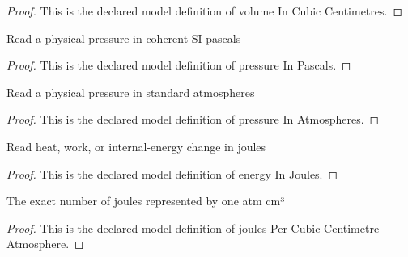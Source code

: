 \begin{proof}
  This is the declared model definition of volume In Cubic Centimetres.
\end{proof}
\begin{definition}
  \label{def:physics:phyx-mini-0410:phyxminiproblems-problemphyxmini0410-pressureinpascals}
  Read a physical pressure in coherent SI pascals
\end{definition}
\begin{proof}
  This is the declared model definition of pressure In Pascals.
\end{proof}
\begin{definition}
  \label{def:physics:phyx-mini-0410:phyxminiproblems-problemphyxmini0410-pressureinatmospheres}
  Read a physical pressure in standard atmospheres
\end{definition}
\begin{proof}
  This is the declared model definition of pressure In Atmospheres.
\end{proof}
\begin{definition}
  \label{def:physics:phyx-mini-0410:phyxminiproblems-problemphyxmini0410-energyinjoules}
  Read heat, work, or internal-energy change in joules
\end{definition}
\begin{proof}
  This is the declared model definition of energy In Joules.
\end{proof}
\begin{definition}
  \label{def:physics:phyx-mini-0410:phyxminiproblems-problemphyxmini0410-joulespercubiccentimetreatmosphere}
  The exact number of joules represented by one atm cm³
\end{definition}
\begin{proof}
  This is the declared model definition of joules Per Cubic Centimetre Atmosphere.
\end{proof}
